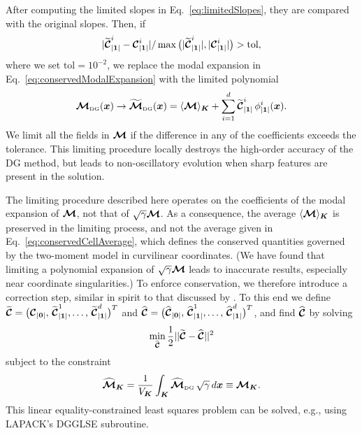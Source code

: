 \documentclass[10pt,preprint]{aastex}
\begin{document}
After computing the limited slopes in Eq.~\eqref{eq:limitedSlopes}, they are compared with the original slopes.  
Then, if
\begin{equation}
  |\widetilde{\boldsymbol{\mathcal{C}}}_{|\boldsymbol{1}|}^{i}-\boldsymbol{\mathcal{C}}_{|\boldsymbol{1}|}^{i}|/\max\big(|\widetilde{\boldsymbol{\mathcal{C}}}_{|\boldsymbol{1}|}^{i}|,|\boldsymbol{\mathcal{C}}_{|\boldsymbol{1}|}^{i}|\big)>\text{tol},
\end{equation}
where we set $\text{tol}=10^{-2}$, we replace the modal expansion in Eq.~\eqref{eq:conservedModalExpansion} with the limited polynomial
\begin{equation}
  \boldsymbol{\mathcal{M}}_{\mbox{\tiny DG}}(\boldsymbol{x})
  \to\widetilde{\boldsymbol{\mathcal{M}}}_{\mbox{\tiny DG}}(\boldsymbol{x})
  =\langle\boldsymbol{\mathcal{M}}\rangle_{\boldsymbol{K}}+\sum_{i=1}^{d}\widetilde{\boldsymbol{\mathcal{C}}}_{|\boldsymbol{1}|}^{i}\,\phi_{|\boldsymbol{1}|}^{i}(\boldsymbol{x}).  
  \label{eq:conservedModalExpansionLimited}
\end{equation}
We limit all the fields in $\boldsymbol{\mathcal{M}}$ if the difference in any of the coefficients exceeds the tolerance.  
This limiting procedure locally destroys the high-order accuracy of the DG method, but leads to non-oscillatory evolution when sharp features are present in the solution.  

The limiting procedure described here operates on the coefficients of the modal expansion of $\boldsymbol{\mathcal{M}}$, not that of $\sqrt{\gamma}\boldsymbol{\mathcal{M}}$.  
As a consequence, the average $\langle\boldsymbol{\mathcal{M}}\rangle_{\boldsymbol{K}}$ is preserved in the limiting process, and not the average given in Eq.~\eqref{eq:conservedCellAverage}, which defines the conserved quantities governed by the two-moment model in curvilinear coordinates.  
(We have found that limiting a polynomial expansion of $\sqrt{\gamma}\boldsymbol{\mathcal{M}}$ leads to inaccurate results, especially near coordinate singularities.)  
To enforce conservation, we therefore introduce a correction step, similar in spirit to that discussed by \citet{radiceRezzolla_2011}.  
To this end we define $\widetilde{\boldsymbol{\mathcal{C}}}=\big(\boldsymbol{\mathcal{C}}_{|\boldsymbol{0}|},\,\widetilde{\boldsymbol{\mathcal{C}}}_{|\boldsymbol{1}|}^{1},\ldots,\,\widetilde{\boldsymbol{\mathcal{C}}}_{|\boldsymbol{1}|}^{d}\big)^{T}$ and $\widehat{\boldsymbol{\mathcal{C}}}=\big(\widehat{\boldsymbol{\mathcal{C}}}_{|\boldsymbol{0}|},\,\widehat{\boldsymbol{\mathcal{C}}}_{|\boldsymbol{1}|}^{1},\ldots,\,\widehat{\boldsymbol{\mathcal{C}}}_{|\boldsymbol{1}|}^{d}\big)^{T}$, and find $\widehat{\boldsymbol{\mathcal{C}}}$ by solving
\begin{equation}
  \min_{\widehat{\boldsymbol{\mathcal{C}}}}\frac{1}{2}||\widetilde{\boldsymbol{\mathcal{C}}}-\widehat{\boldsymbol{\mathcal{C}}}||^{2}
\end{equation}
subject to the constraint
\begin{equation}
  \widehat{\boldsymbol{\mathcal{M}}}_{\boldsymbol{K}}=\frac{1}{V_{\boldsymbol{K}}}\int_{\boldsymbol{K}}\widehat{\boldsymbol{\mathcal{M}}}_{\mbox{\tiny DG}}\,\sqrt{\gamma}\,d\boldsymbol{x}\equiv\boldsymbol{\mathcal{M}}_{\boldsymbol{K}}.  
\end{equation}
This linear equality-constrained least squares problem can be solved, e.g., using LAPACK's DGGLSE subroutine.  
\end{document}
